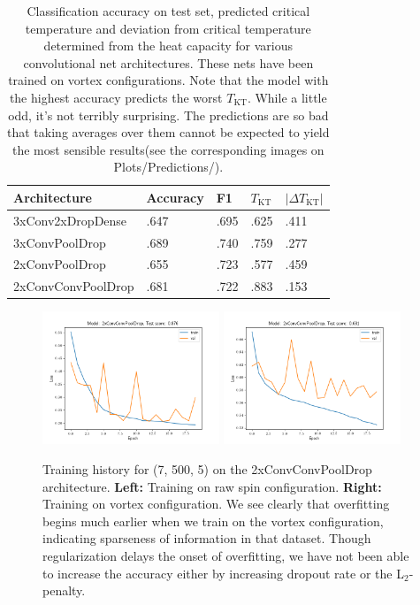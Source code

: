 \documentclass[]{article}
\begin{document}
\begin{table}[H]
	\centering
	\begin{tabular}{l|l|l|l|l}
		Architecture & Accuracy & F1 & $T_\text{KT}$ & $|\Delta T_\text{KT}|$ \\
		\hline 
		3xConv2xDropDense & .647 & .695 & .625 &  .411  \\
		3xConvPoolDrop & .689 & .740 & .759 &  .277  \\
		2xConvPoolDrop & .655 & .723 & .577 &  .459 \\
		2xConvConvPoolDrop & .681 & .722 & .883 & .153 \\
	\end{tabular}
	\caption{Classification accuracy on test set, predicted critical temperature and deviation from critical temperature determined from the heat capacity for various convolutional net architectures. These nets have been trained on vortex configurations. Note that the model with the highest accuracy predicts the worst $T_\text{KT}$. While a little odd, it's not terribly surprising. The predictions are so bad that taking averages over them cannot be expected to yield the most sensible results(see the corresponding images on Plots/Predictions/). }
	\label{tab:cnn_scores_vortex}
\end{table}

\begin{figure}[h]
	\hspace{-30px}
	\includegraphics[width=200px]{../Plots/TrainTestScores/V0_L7_M500_N5_2xConvConvPoolDrop.png}
	\includegraphics[width=200px]{../Plots/TrainTestScores/V1_L7_M500_N5_2xConvConvPoolDrop.png}
	\caption{Training history for (7, 500, 5) on the 2xConvConvPoolDrop architecture. \textbf{Left:} Training on raw spin configuration. \textbf{Right:} Training on vortex configuration. We see clearly that overfitting begins much earlier when we train on the vortex configuration, indicating sparseness of information in that dataset. Though regularization delays the onset of overfitting, we have not been able to increase the accuracy either by increasing dropout rate or the L$_2$-penalty. }
	\label{fig:train_val_history_cnn}
\end{figure}
\end{document}
